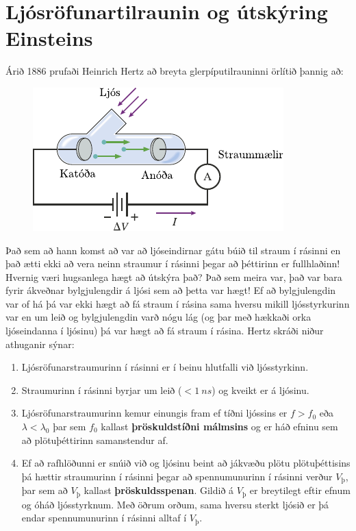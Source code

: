 \section{Ljósröfunartilraunin og útskýring Einsteins}

Árið 1886 prufaði Heinrich Hertz að breyta glerpíputilrauninni örlítið þannig að:

\begin{figure}[H]
    \centering
    \includegraphics{figures/photoelectric1.pdf}
\end{figure}

Það sem að hann komst að var að ljóseindirnar gátu búið til straum í rásinni en það ætti ekki að vera neinn straumur í rásinni þegar að þéttirinn er fullhlaðinn! Hvernig væri hugsanlega hægt að útskýra það? Það sem meira var, það var bara fyrir ákveðnar bylgjulengdir á ljósi sem að þetta var hægt! Ef að bylgjulengdin var of há þá var ekki hægt að fá straum í rásina sama hversu mikill ljósstyrkurinn var en um leið og bylgjulengdin varð nógu lág (og þar með hækkaði orka ljóseindanna í ljósinu) þá var hægt að fá straum í rásina. Hertz skráði niður athuganir sýnar:

\begin{enumerate}[label =  (\arabic*)]
    \item Ljósröfunarstraumurinn í rásinni er í beinu hlutfalli við ljósstyrkinn.
    
    \item Straumurinn í rásinni byrjar um leið ($< \SI{1}{ns}$) og kveikt er á ljósinu.
    
    \item Ljósröfunarstraumurinn kemur einungis fram ef tíðni ljóssins er $f > f_0$ eða $\lambda < \lambda_0$ þar sem $f_0$ kallast \textbf{þröskuldstíðni málmsins} og er háð efninu sem að plötuþéttirinn samanstendur af.
    
    \item Ef að rafhlöðunni er snúið við og ljósinu beint að jákvæðu plötu plötuþéttisins þá hættir straumurinn í rásinni þegar að spennumunurinn í rásinni verður $V_{\text{þ}}$, þar sem að $V_{\text{þ}}$ kallast \textbf{þröskuldsspenan}. Gildið á $V_{\text{þ}}$ er breytilegt eftir efnum og óháð ljósstyrknum. Með öðrum orðum, sama hversu sterkt ljósið er þá endar spennumunurinn í rásinni alltaf í $V_{\text{þ}}$.
\end{enumerate}

